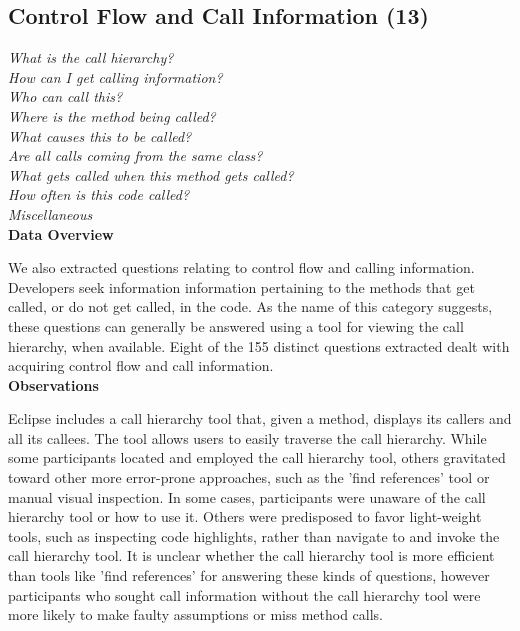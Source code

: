 \documentclass[conference]{IEEEtran}
\begin{document}

\noindent\subsection{\textbf{Control Flow and Call Information (13)}}\label{cf}

\noindent\emph{What is the call hierarchy?} \\
\emph{How can I get calling information?} \\
\emph{Who can call this?} \\
\emph{Where is the method being called?} \\
\emph{What causes this to be called?} \\
\emph{Are all calls coming from the same class?} \\
\emph{What gets called when this method gets called?} \\
\emph{How often is this code called?} \\
\emph{Miscellaneous} \\


\noindent\textbf{Data Overview}

We also extracted questions relating to control flow and calling information. 
Developers seek information information pertaining to the methods that get called, or do not get called, in the code. 
As the name of this category suggests, these questions can generally be answered using a tool for viewing the call hierarchy, when available. 
Eight of the 155 distinct questions extracted dealt with acquiring control flow and call information.
\\

\noindent\textbf{Observations}

Eclipse includes a call hierarchy tool that, given a method, displays its callers and all its callees. 
The tool allows users to easily traverse the call hierarchy. 
While some participants located and employed the call hierarchy tool, others gravitated toward other more error-prone approaches, such as the 'find references' tool or manual visual inspection. 
In some cases, participants were unaware of the call hierarchy tool or how to use it. 
Others were predisposed to favor light-weight tools, such as inspecting code highlights, rather than navigate to and invoke the call hierarchy tool.
It is unclear whether the call hierarchy tool is more efficient than tools like 'find references' for answering these kinds of questions, however participants who sought call information without the call hierarchy tool were more likely to make faulty assumptions or miss method calls. 
\end{document}
